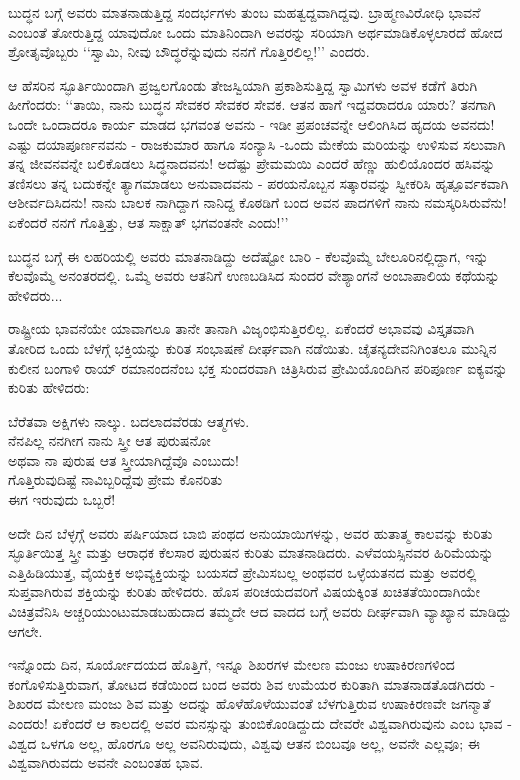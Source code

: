  ಬುದ್ಧನ ಬಗ್ಗೆ ಅವರು ಮಾತನಾಡುತ್ತಿದ್ದ ಸಂದರ್ಭಗಳು ತುಂಬ ಮಹತ್ವದ್ದವಾಗಿದ್ದವು. ಬ್ರಾಹ್ಮಣವಿರೋಧಿ ಭಾವನೆ ಎಂಬಂತೆ ತೋರುತ್ತಿದ್ದ ಯಾವುದೋ ಒಂದು ಮಾತಿನಿಂದಾಗಿ ಅವರನ್ನು ಸರಿಯಾಗಿ ಅರ್ಥಮಾಡಿಕೊಳ್ಳಲಾರದೆ ಹೋದ ಶ್ರೋತೃವೊಬ್ಬರು ‘‘ಸ್ವಾಮಿ, ನೀವು ಬೌದ್ಧರೆನ್ನುವುದು ನನಗೆ ಗೊತ್ತಿರಲಿಲ್ಲ!’’ ಎಂದರು.

ಆ ಹೆಸರಿನ ಸ್ಫೂರ್ತಿಯಿಂದಾಗಿ ಪ್ರಜ್ವಲಗೊಂಡು ತೇಜಸ್ವಿಯಾಗಿ ಪ್ರಕಾಶಿಸುತ್ತಿದ್ದ ಸ್ವಾಮಿಗಳು ಅವಳ ಕಡೆಗೆ ತಿರುಗಿ ಹೀಗೆಂದರು: ‘‘ತಾಯಿ, ನಾನು ಬುದ್ಧನ ಸೇವಕರ ಸೇವಕರ ಸೇವಕ. ಆತನ ಹಾಗೆ ಇದ್ದವರಾದರೂ ಯಾರು? ತನಗಾಗಿ ಒಂದೇ ಒಂದಾದರೂ ಕಾರ್ಯ ಮಾಡದ ಭಗವಂತ ಅವನು - ಇಡೀ ಪ್ರಪಂಚವನ್ನೇ ಆಲಿಂಗಿಸಿದ ಹೃದಯ ಅವನದು! ಎಷ್ಟು ದಯಾಪೂರ್ಣನವನು - ರಾಜಕುಮಾರ ಹಾಗೂ ಸಂನ್ಯಾಸಿ -ಒಂದು ಮೇಕೆಯ ಮರಿಯನ್ನು ಉಳಿಸುವ ಸಲುವಾಗಿ ತನ್ನ ಜೀವನವನ್ನೇ ಬಲಿಕೊಡಲು ಸಿದ್ಧನಾದವನು! ಅದೆಷ್ಟು ಪ್ರೇಮಮಯಿ ಎಂದರೆ ಹೆಣ್ಣು ಹುಲಿಯೊಂದರ ಹಸಿವನ್ನು ತಣಿಸಲು ತನ್ನ ಬದುಕನ್ನೇ ತ್ಯಾಗಮಾಡಲು ಅನುವಾದವನು - ಪರಯನೊಬ್ಬನ ಸತ್ಕಾರವನ್ನು ಸ್ವೀಕರಿಸಿ ಹೃತ್ಪೂರ್ವಕವಾಗಿ ಆಶೀರ್ವದಿಸಿದನು! ನಾನು ಬಾಲಕ ನಾಗಿದ್ದಾಗ ನಾನಿದ್ದ ಕೊಠಡಿಗೆ ಬಂದ ಅವನ ಪಾದಗಳಿಗೆ ನಾನು ನಮಸ್ಕರಿಸಿರುವೆನು! ಏಕೆಂದರೆ ನನಗೆ ಗೊತ್ತಿತ್ತು, ಆತ ಸಾಕ್ಷಾತ್ ಭಗವಂತನೇ ಎಂದು!’’

ಬುದ್ಧನ ಬಗ್ಗೆ ಈ ಲಹರಿಯಲ್ಲಿ ಅವರು ಮಾತನಾಡಿದ್ದು ಅದೆಷ್ಟೋ ಬಾರಿ - ಕೆಲವೊಮ್ಮೆ ಬೇಲೂರಿನಲ್ಲಿದ್ದಾಗ, ಇನ್ನು ಕೆಲವೊಮ್ಮೆ ಅನಂತರದಲ್ಲಿ. ಒಮ್ಮೆ ಅವರು ಆತನಿಗೆ ಉಣಬಡಿಸಿದ ಸುಂದರ ವೇಶ್ಯಾಂಗನೆ ಅಂಬಾಪಾಲಿಯ ಕಥೆಯನ್ನು ಹೇಳಿದರು...

ರಾಷ್ಟ್ರೀಯ ಭಾವನೆಯೇ ಯಾವಾಗಲೂ ತಾನೇ ತಾನಾಗಿ ವಿಜೃಂಭಿಸುತ್ತಿರಲಿಲ್ಲ. ಏಕೆಂದರೆ ಅಭಾವವು ವಿಸ್ತೃತವಾಗಿ ತೋರಿದ ಒಂದು ಬೆಳಗ್ಗೆ ಭಕ್ತಿಯನ್ನು ಕುರಿತ ಸಂಭಾಷಣೆ ದೀರ್ಘವಾಗಿ ನಡೆಯಿತು. ಚೈತನ್ಯದೇವನಿಗಿಂತಲೂ ಮುನ್ನಿನ ಕುಲೀನ ಬಂಗಾಳಿ ರಾಯ್​ ರಮಾನಂದನೆಂಬ ಭಕ್ತ ಸುಂದರವಾಗಿ ಚಿತ್ರಿಸಿರುವ ಪ್ರೇಮಿಯೊಂದಿಗಿನ ಪರಿಪೂರ್ಣ ಐಕ್ಯವನ್ನು ಕುರಿತು ಹೇಳಿದರು:

\begin{myquote}
ಬೆರೆತವಾ ಅಕ್ಷಿಗಳು ನಾಲ್ಕು. ಬದಲಾದವೆರಡು ಆತ್ಮಗಳು.\\ನೆನಪಿಲ್ಲ ನನಗೀಗ ನಾನು ಸ್ತ್ರೀ ಆತ ಪುರುಷನೋ\\ಅಥವಾ ನಾ ಪುರುಷ ಆತ ಸ್ತ್ರೀಯಾಗಿದ್ದೆವೊ ಎಂಬುದು!\\ಗೊತ್ತಿರುವುದಿಷ್ಟೆ ನಾವಿಬ್ಬರಿದ್ದೆವು ಪ್ರೇಮ ಕೊನರಿತು\\ಈಗ ಇರುವುದು ಒಬ್ಬರೆ!
\end{myquote}

ಅದೇ ದಿನ ಬೆಳ್ಳಗ್ಗೆ ಅವರು ಪರ್ಷಿಯಾದ ಬಾಬಿ ಪಂಥದ ಅನುಯಾಯಿಗಳನ್ನು, ಅವರ ಹುತಾತ್ಮ ಕಾಲವನ್ನು ಕುರಿತು ಸ್ಫೂರ್ತಿಯಿತ್ತ ಸ್ತ್ರೀ ಮತ್ತು ಆರಾಧಕ ಕೆಲಸಾರ ಪುರುಷನ ಕುರಿತು ಮಾತನಾಡಿದರು. ಎಳೆವಯಸ್ಸಿನವರ ಹಿರಿಮೆಯನ್ನು ಎತ್ತಿಹಿಡಿಯುತ್ತ, ವೈಯಕ್ತಿಕ ಅಭಿವ್ಯಕ್ತಿಯನ್ನು ಬಯಸದೆ ಪ್ರೇಮಿಸಬಲ್ಲ ಅಂಥವರ ಒಳ್ಳೆಯತನದ ಮತ್ತು ಅವರಲ್ಲಿ ಸುಪ್ತವಾಗಿರುವ ಶಕ್ತಿಯನ್ನು ಕುರಿತು ಹೇಳಿದರು. ಹೊಸ ಪರಿಚಯದವರಿಗೆ ವಿಷಯಕ್ಕಿಂತ ಖಚಿತತೆಯಿಂದಾಗಿಯೇ ವಿಚಿತ್ರವೆನಿಸಿ ಅಚ್ಚರಿಯುಂಟುಮಾಡಬಹುದಾದ ತಮ್ಮದೇ ಆದ ವಾದದ ಬಗ್ಗೆ ಅವರು ದೀರ್ಘವಾಗಿ ವ್ಯಾಖ್ಯಾನ ಮಾಡಿದ್ದು ಆಗಲೇ.

ಇನ್ನೊಂದು ದಿನ, ಸೂರ್ಯೋದಯದ ಹೊತ್ತಿಗೆ, ಇನ್ನೂ ಶಿಖರಗಳ ಮೇಲಣ ಮಂಜು ಉಷಾಕಿರಣಗಳಿಂದ ಕಂಗೊಳಿಸುತ್ತಿರುವಾಗ, ತೋಟದ ಕಡೆಯಿಂದ ಬಂದ ಅವರು ಶಿವ ಉಮೆಯರ ಕುರಿತಾಗಿ ಮಾತನಾಡತೊಡಗಿದರು - ಶಿಖರದ ಮೇಲಣ ಮಂಜು ಶಿವ ಮತ್ತು ಅದನ್ನು ಹೊಳೆಹೊಳೆಯುವಂತೆ ಬೆಳಗುತ್ತಿರುವ ಉಷಾಕಿರಣವೇ ಜಗನ್ಮಾತೆ ಎಂದರು! ಏಕೆಂದರೆ ಆ ಕಾಲದಲ್ಲಿ ಅವರ ಮನಸ್ಸುನ್ನು ತುಂಬಿಕೊಂಡಿದ್ದುದು ದೇವರೇ ವಿಶ್ವವಾಗಿರುವುನು ಎಂಬ ಭಾವ - ವಿಶ್ವದ ಒಳಗೂ ಅಲ್ಲ, ಹೊರಗೂ ಅಲ್ಲ ಅವನಿರುವುದು, ವಿಶ್ವವು ಆತನ ಬಿಂಬವೂ ಅಲ್ಲ, ಅವನೇ ಎಲ್ಲವೂ; ಈ ವಿಶ್ವವಾಗಿರುವದು ಅವನೇ ಎಂಬಂತಹ ಭಾವ.


